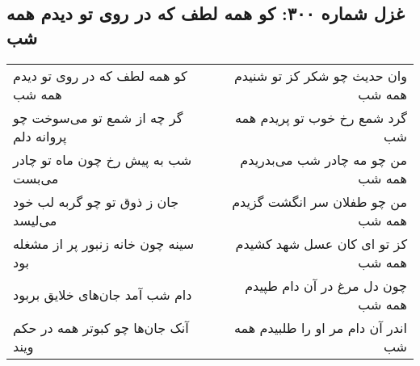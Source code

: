 \begin{center}
\section*{غزل شماره ۳۰۰: کو همه لطف که در روی تو دیدم همه شب}
\label{sec:0300}
\begin{longtable}{l p{0.5cm} r}
کو همه لطف که در روی تو دیدم همه شب
&&
وان حدیث چو شکر کز تو شنیدم همه شب
\\
گر چه از شمع تو می‌سوخت چو پروانه دلم
&&
گرد شمع رخ خوب تو پریدم همه شب
\\
شب به پیش رخ چون ماه تو چادر می‌بست
&&
من چو مه چادر شب می‌بدریدم همه شب
\\
جان ز ذوق تو چو گربه لب خود می‌لیسد
&&
من چو طفلان سر انگشت گزیدم همه شب
\\
سینه چون خانه زنبور پر از مشغله بود
&&
کز تو ای کان عسل شهد کشیدم همه شب
\\
دام شب آمد جان‌های خلایق بربود
&&
چون دل مرغ در آن دام طپیدم همه شب
\\
آنک جان‌ها چو کبوتر همه در حکم ویند
&&
اندر آن دام مر او را طلبیدم همه شب
\\
\end{longtable}
\end{center}
